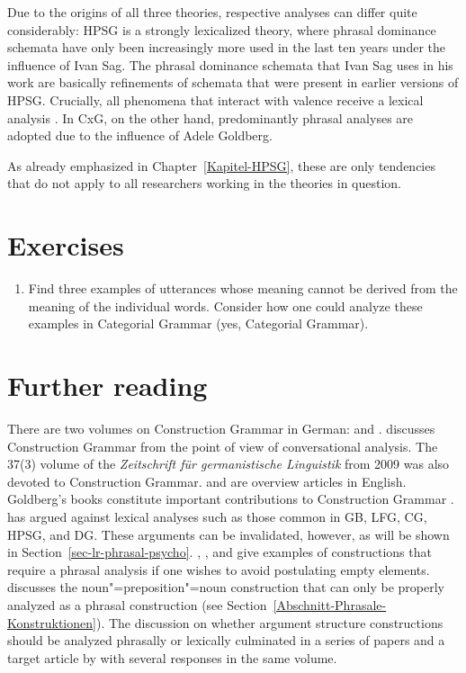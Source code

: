 Due to the origins of all three theories, respective analyses can differ quite considerably: HPSG is a strongly lexicalized theory, where
phrasal dominance schemata have only been increasingly more used in the last ten years under the
influence of Ivan Sag. The phrasal dominance schemata that Ivan Sag uses in
his work are basically refinements of schemata that were present in earlier versions of
HPSG. Crucially, all phenomena that interact with valence receive a lexical analysis \citep*[Section~2.3]{SBK2012a}.
In CxG, on the other hand, predominantly phrasal analyses are adopted due to the influence of Adele Goldberg.%

As already emphasized in Chapter~\ref{Kapitel-HPSG}, these are only tendencies that do not apply to all researchers working in the
theories in question.



\section*{Exercises}

\begin{enumerate}
\item Find three examples of utterances whose meaning cannot be derived from the meaning of the individual words. Consider how
one could analyze these examples in Categorial Grammar (yes, Categorial Grammar).
\end{enumerate}

\section*{Further reading}

There are two volumes on Construction Grammar in German:  and .
\citet{Deppermann2006a} discusses Construction Grammar from the point of view of conversational
analysis.  The 37(3) volume of the \textit{Zeitschrift für germanistische Linguistik} from 2009 was
also devoted to Construction Grammar.   and  are overview
articles in English. Goldberg's books constitute important contributions to Construction Grammar
\citeyearpar{Goldberg95a,Goldberg2006a,Goldberg2009a}.  \citet{Goldberg95a} has argued against
lexical analyses such as those common in GB, LFG, CG, HPSG, and DG. These arguments can be
invalidated, however, as will be shown in Section~\ref{sec-lr-phrasal-psycho}.
\citet{Sag97a}, \citet{Borsley2006a}, \citet{Jacobs2008a} and \citet{ML2009a} give examples of
constructions that require a phrasal analysis if one wishes to avoid postulating empty elements.
\citet{Jackendoff2008a} discusses the noun"=preposition"=noun construction that can only be properly
analyzed as a phrasal construction (see Section~\ref{Abschnitt-Phrasale-Konstruktionen}). The
discussion on whether argument structure constructions should be analyzed phrasally or lexically
\citep{Goldberg95a,Goldberg2006a,Mueller2006d} culminated in a series of papers
\citep{Goldberg2013a} and a target article by \citet{MWArgSt} with several responses in the same
volume.

